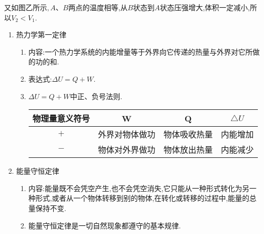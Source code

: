 又如图乙所示$ ,A $、$ B $两点的温度相等,从$ B $状态到$ A $状态压强增大,体积一定减小,所以$ V_2<V_1 $.


\begin{enumerate}
\renewcommand{\labelenumi}{\arabic{enumi}.}
\item
热力学第一定律
\begin{enumerate}
\renewcommand{\labelenumi}{\arabic{enumi}.}
\item
内容:一个热力学系统的内能增量等于外界向它传递的热量与外界对它所做的功的和.
\item 
表达式:$\Delta U = Q + W$.
\item 
$\Delta U = Q + W$中正、负号法则.
\begin{table}[h!]
\centering 
\begin{tabular}{|c|c|c|c|}
\hline 
物理量意义符号 & W & Q & $ \triangle U $
\\
\hline
$ + $& 外界对物体做功 & 物体吸收热量 & 内能增加
\\
\hline
$ - $& 物体对外界做功 & 物体放出热量 & 内能减少
\\
\hline
\end{tabular}
\end{table} 




\end{enumerate}

\item 
能量守恒定律

\begin{enumerate}
\renewcommand{\labelenumi}{\arabic{enumi}.}
\item
内容:能量既不会凭空产生,也不会凭空消失,它只能从一种形式转化为另一种形式,或者从一个物体转移到别的物体,在转化或转移的过程中,能量的总量保持不变.

\item 
能量守恒定律是一切自然现象都遵守的基本规律.



\end{enumerate}

\end{enumerate}

